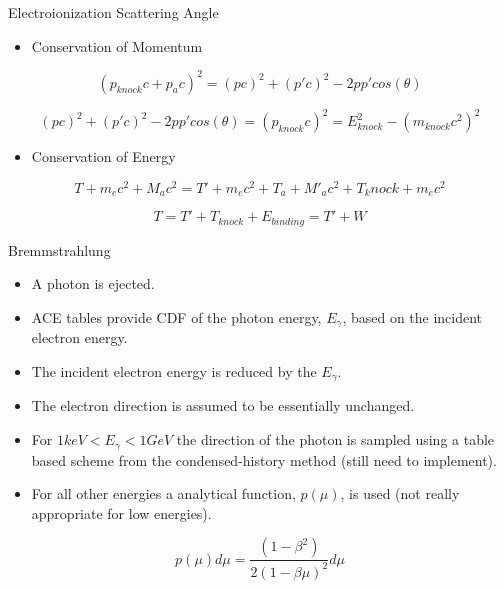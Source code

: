 \documentclass{beamer}
\begin{document}
\begin{frame}{Electroionization Scattering Angle}
  \begin{itemize}
    \item Conservation of Momentum
  \end{itemize}

  \begin{equation*}
    (p_{knock}c + p_{a}c)^2 = (pc)^2 + (p'c)^2 - 2pp'cos(\theta)
  \end{equation*}

  \begin{equation*}
    (pc)^2 + (p'c)^2 - 2pp'cos(\theta) = (p_{knock}c)^2 =
              E_{knock}^2 - (m_{knock}c^2)^2
  \end{equation*}

  \begin{itemize}
    \item Conservation of Energy
  \end{itemize}

  \begin{equation*}
    T + m_ec^2 + M_ac^2 =T' + m_ec^2 + T_a + M'_ac^2 + T_knock + m_ec^2
  \end{equation*}

  \begin{equation*}
    T = T' + T_{knock} + E_{binding} = T' + W 
  \end{equation*}


\end{frame}

\begin{frame}{Bremmstrahlung}

  \begin{itemize}
    \item A photon is ejected.
    \item ACE tables provide CDF of the photon energy, $E_{\gamma}$, based on the incident electron energy.
    \item The incident electron energy is reduced by the $E_{\gamma}$.
    \item The electron direction is assumed to be essentially unchanged.
    \item For $1 keV <  E_{\gamma} < 1 GeV$ the direction of the photon is 
           sampled using a table based scheme from the condensed-history method (still need to implement). 
    \item For all other energies a analytical function, $p(\mu)$, is used (not 
           really appropriate for low energies).
  \end{itemize}

  \begin{equation*}
    p(\mu)d\mu = \frac{(1-\beta^2)}{2(1-\beta\mu)^2}d\mu
  \end{equation*}


\end{frame}
\end{document}
